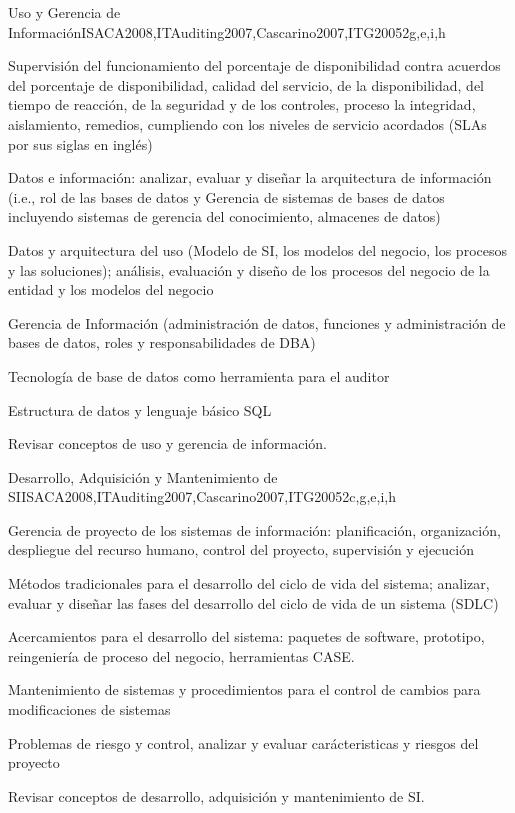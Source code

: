 \begin{syllabus}
	\begin{unit}{Uso y Gerencia de Información}{}{ISACA2008,ITAuditing2007,Cascarino2007,ITG2005}{2}{g,e,i,h}
	\begin{topics}
	\item Supervisión del funcionamiento del porcentaje de disponibilidad contra acuerdos del porcentaje de disponibilidad, calidad del servicio, de la disponibilidad, del tiempo de reacción, de la seguridad y de los controles, proceso la integridad, aislamiento, remedios, cumpliendo con los niveles de servicio acordados (SLAs por sus siglas en
	inglés)
	\item Datos e información: analizar, evaluar y diseñar la arquitectura de información (i.e., rol de las bases de datos y Gerencia de sistemas de bases de datos incluyendo sistemas de gerencia del conocimiento, almacenes de datos)
	\item Datos y arquitectura del uso (Modelo de SI, los modelos del negocio, los procesos y las soluciones); análisis, evaluación y diseño de los procesos del negocio de la entidad y los modelos del negocio
	\item Gerencia de Información (administración de datos, funciones y administración de bases de datos, roles y responsabilidades de DBA)
	\item Tecnología de base de datos como herramienta para el auditor
	\item Estructura de datos y lenguaje básico SQL
	\end{topics}
	\begin{learningoutcomes}
	\item Revisar conceptos de uso y gerencia de información.
	\end{learningoutcomes}
	\end{unit}
	
	\begin{unit}{Desarrollo, Adquisición y Mantenimiento de SI}{}{ISACA2008,ITAuditing2007,Cascarino2007,ITG2005}{2}{c,g,e,i,h}
	\begin{topics}
	\item Gerencia de proyecto de los sistemas de información: planificación, organización, despliegue del recurso humano, control del proyecto, supervisión y ejecución
	\item Métodos tradicionales para el desarrollo del ciclo de vida del sistema; analizar, evaluar y diseñar las fases del desarrollo del ciclo de vida de un sistema (SDLC)
	\item Acercamientos para el desarrollo del sistema: paquetes de software, prototipo, reingeniería de proceso del negocio, herramientas CASE.
	\item Mantenimiento de sistemas y procedimientos para el control de cambios para modificaciones de sistemas
	\item Problemas de riesgo y control, analizar y evaluar carácteristicas y riesgos del proyecto
	\end{topics}
	\begin{learningoutcomes}
	\item Revisar conceptos de desarrollo, adquisición y mantenimiento de SI.
	\end{learningoutcomes}
	\end{unit}
	

\end{syllabus}
